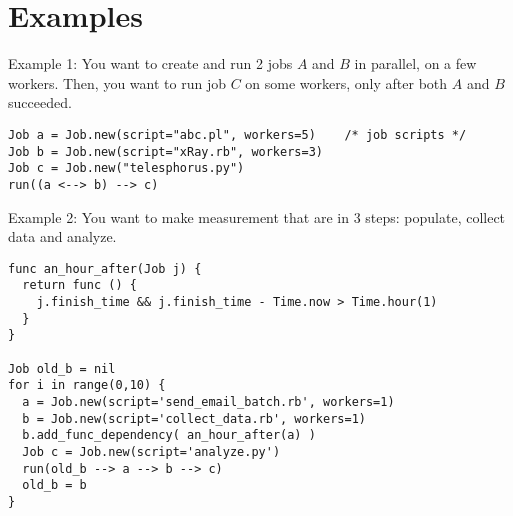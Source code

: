 \section{Examples}
\label{sect:ex}
Example 1: You want to create and run 2 jobs $A$ and $B$ in parallel, on a few
workers. Then, you want to run job $C$ on some workers, only after both $A$
and $B$ succeeded.
\begin{lstlisting}
Job a = Job.new(script="abc.pl", workers=5)    /* job scripts */
Job b = Job.new(script="xRay.rb", workers=3)
Job c = Job.new("telesphorus.py")
run((a <--> b) --> c)
\end{lstlisting}
Example 2: You want to make measurement that are in 3 steps: populate, collect
data and analyze.
\begin{lstlisting}
func an_hour_after(Job j) {
  return func () {
    j.finish_time && j.finish_time - Time.now > Time.hour(1)
  }
}

Job old_b = nil
for i in range(0,10) {
  a = Job.new(script='send_email_batch.rb', workers=1)
  b = Job.new(script='collect_data.rb', workers=1)
  b.add_func_dependency( an_hour_after(a) )
  Job c = Job.new(script='analyze.py')
  run(old_b --> a --> b --> c)
  old_b = b
}
\end{lstlisting}
